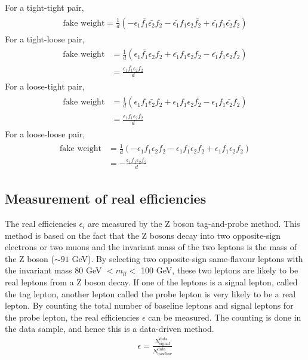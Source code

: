 For a tight-tight pair,
\begin{align}
\begin{split}
\text{fake weight} = \frac{1}{d} (
- \epsilon_1 \bar{f_1} \bar{\epsilon_2} f_2
- \bar{\epsilon_1} f_1 \epsilon_2 \bar{f_2}
+ \bar{\epsilon_1} f_1 \bar{\epsilon_2} f_2 )
\end{split}
\end{align}
For a tight-loose pair,
\begin{align}
\begin{split}
\text{fake weight} &= \frac{1}{d} (
\epsilon_1 \bar{f_1} \epsilon_2 f_2
+ \bar{\epsilon_1} f_1 \epsilon_2 f_2
- \bar{\epsilon_1} f_1 \epsilon_2 f_2 ) \\
&= \frac{\epsilon_1 \bar{f_1} \epsilon_2 f_2}{d}
\end{split}
\end{align}
For a loose-tight pair,
\begin{align}
\begin{split}
\text{fake weight} &= \frac{1}{d} (
\epsilon_1 f_1 \bar{\epsilon_2} f_2
+ \epsilon_1 f_1 \epsilon_2 \bar{f_2}
- \epsilon_1 f_1 \bar{\epsilon_2} f_2 ) \\
&= \frac{\epsilon_1 f_1 \epsilon_2 \bar{f_2}}{d}
\end{split}
\end{align}
For a loose-loose pair,
\begin{align}
\begin{split}
\text{fake weight} &= \frac{1}{d} (
- \epsilon_1 f_1 \epsilon_2 f_2
- \epsilon_1 f_1 \epsilon_2 f_2
+ \epsilon_1 f_1 \epsilon_2 f_2 ) \\
&= - \frac{\epsilon_1 f_1 \epsilon_2 f_2}{d}
\end{split}
\end{align}

\subsection{Measurement of real efficiencies}
\label{sec:real_eff}
The real efficiencies $\epsilon_i$ are measured by the Z boson tag-and-probe method.
This method is based on the fact that the Z bosons decay into two opposite-sign electrons or two muons and the invariant mass of the two leptons is the mass of the Z boson ($\sim 91$ GeV).
By selecting two opposite-sign same-flavour leptons with the invariant mass 80 GeV $< m_{ll} <$ 100 GeV, these two leptons are likely to be real leptons from a Z boson decay.
If one of the leptons is a signal lepton, called the tag lepton, another lepton called the probe lepton is very likely to be a real lepton.
By counting the total number of baseline leptons and signal leptons for the probe lepton, the real efficiencies $\epsilon$ can be measured.
The counting is done in the data sample, and hence this is a data-driven method.
\begin{align}
\epsilon = \frac{N^{\text{data}}_{\text{signal}}}{N^{\text{data}}_{\text{baseline}}}
\end{align}


